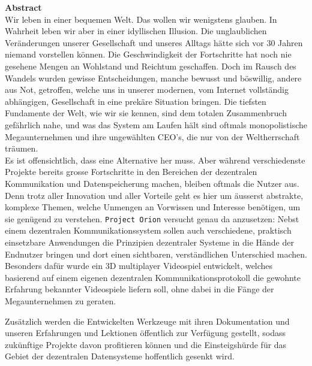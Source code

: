 \documentclass[11pt]{article}
\begin{document}
\newpage  
\begin{ABSTRACT}
\textbf{Abstract}\\
\noindent Wir leben in einer bequemen Welt. Das wollen wir wenigstens
glauben. In Wahrheit leben wir aber in einer idyllischen Illusion. Die
unglaublichen Veränderungen unserer Gesellschaft und unseres Alltags
hätte sich vor 30 Jahren niemand vorstellen können. Die
Geschwindigkeit der Fortschritte hat noch nie gesehene Mengen an
Wohlstand und Reichtum geschaffen. Doch im Rausch des Wandels wurden
gewisse Entscheidungen, manche bewusst und böswillig, andere aus Not,
getroffen, welche uns in unserer modernen, vom Internet vollständig
abhängigen, Gesellschaft in eine prekäre Situation bringen. Die
tiefsten Fundamente der Welt, wie wir sie kennen, sind dem totalen
Zusammenbruch gefährlich nahe, und was das System am Laufen hält sind
oftmals monopolistische Megaunternehmen und ihre ungewählten CEO's,
die nur von der Weltherrschaft träumen.\\

\noindent Es ist offensichtlich, dass eine Alternative her muss. Aber
während verschiedenste Projekte bereits grosse Fortschritte in den
Bereichen der dezentralen Kommunikation und Datenspeicherung machen,
bleiben oftmals die Nutzer aus. Denn trotz aller Innovation und aller
Vorteile geht es hier um äusserst abstrakte, komplexe Themen, welche
Unmengen an Vorwissen und Interesse benötigen, um sie genügend zu
verstehen. \texttt{Project Orion} versucht genau da anzusetzen: Nebst einem
dezentralen Kommunikationssystem sollen auch verschiedene, praktisch
einsetzbare Anwendungen die Prinzipien dezentraler Systeme in die
Hände der Endnutzer bringen und dort einen sichtbaren, verständlichen
Unterschied machen. Besonders dafür wurde ein 3D multiplayer
Videospiel entwickelt, welches basierend auf einem eigenen dezentralen
Kommunikationsprotokoll die gewohnte Erfahrung bekannter Videospiele
liefern soll, ohne dabei in die Fänge der Megaunternehmen zu geraten.

\noindent Zusätzlich werden die Entwickelten Werkzeuge mit ihren
Dokumentation und unseren Erfahrungen und Lektionen öffentlich zur
Verfügung gestellt, sodass zukünftige Projekte davon profitieren
können und die Einsteigshürde für das Gebiet der dezentralen
Datensysteme hoffentlich gesenkt wird.
\end{ABSTRACT}
\newpage
\end{document}
